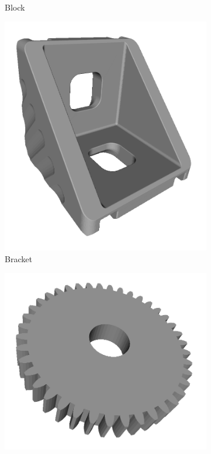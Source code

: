 \begin{figure}[t]
\begin{subfigure}[b]{0.19\linewidth}
		\caption{Block}
	\end{subfigure}
	\begin{subfigure}[b]{0.19\linewidth} \centering
		\includegraphics[width=1\linewidth]{./fig/eval/toshiba_bracket1.png}
		\caption{Bracket}
	\end{subfigure}
	\begin{subfigure}[b]{0.19\linewidth} \centering
		\includegraphics[width=1\linewidth]{./fig/eval/toshiba_cog1.png}

\end{subfigure}
\end{figure}
